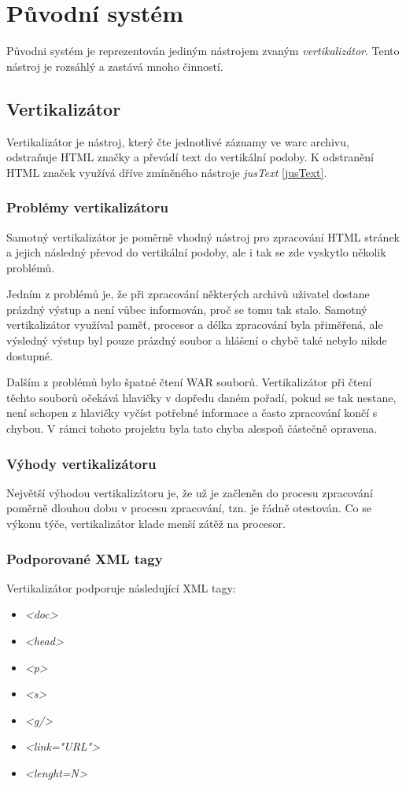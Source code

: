 \section{Původní systém}
Původni systém je reprezentován jediným nástrojem zvaným \textit{vertikalizátor}. Tento nástroj je
rozsáhlý a zastává mnoho činností.

\subsection{Vertikalizátor}
\label{vertikalizator}
Vertikalizátor je nástroj, který čte jednotlivé záznamy ve warc archivu, odstraňuje
HTML značky a převádí text do vertikální podoby. K odstranění HTML značek využívá
dříve zmíněného nástroje \textit{jusText} \ref{jusText}.

\subsubsection{Problémy vertikalizátoru}
Samotný vertikalizátor je poměrně vhodný nástroj pro zpracování HTML stránek a
jejich následný převod do vertikální podoby, ale i tak se zde vyskytlo několik problémů.

Jedním z problémů je, že při zpracování některých archivů uživatel dostane prázdný výstup
a není vůbec informován, proč se tomu tak stalo. Samotný vertikalizátor využíval paměť,
procesor a délka zpracování byla přiměřená, ale výsledný výstup byl pouze prázdný
soubor a hlášení o chybě také nebylo nikde dostupné.

Dalším z problémů bylo špatné čtení WAR souborů. Vertikalizátor při čtení těchto souborů
očekává hlavičky v dopředu daném pořadí, pokud se tak nestane, není schopen z hlavičky
vyčíst potřebné informace a často zpracování končí s chybou. V rámci tohoto projektu
byla tato chyba alespoň částečně opravena.

\subsubsection{Výhody vertikalizátoru}
Největší výhodou vertikalizátoru je, že už je začleněn do procesu zpracování poměrně
dlouhou dobu v procesu zpracování, tzn. je řádně otestován. Co se výkonu týče,
vertikalizátor klade menší zátěž na procesor.

\subsubsection{Podporované XML tagy}
Vertikalizátor podporuje následující XML tagy:
\begin{itemize}
    \item \textit{<doc>}
    \item \textit{<head>}
    \item \textit{<p>}
    \item \textit{<s>}
    \item \textit{<g/>}
    \item \textit{<link="URL"\textgreater}
    \item \textit{<lenght=N>}
\end{itemize}

